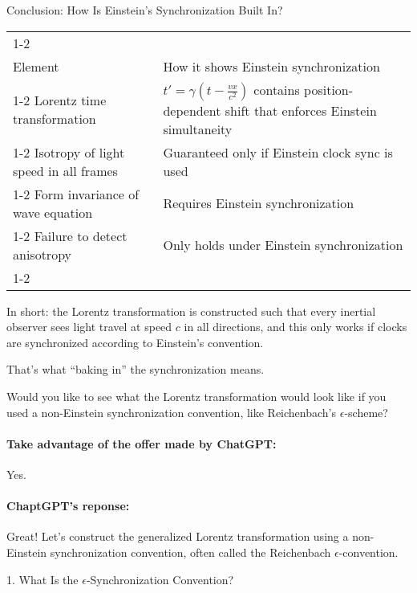 \documentclass[a4paper]{article}
\theoremstyle{plain}
\theoremstyle{definition}
\begin{document}
Conclusion: How Is Einstein's Synchronization Built In?

\begin{tabularx}{1.0\textwidth}{|p{3.4cm}|p{10cm}|}
\cline{1-2} \\
Element & How it shows Einstein synchronization
\\ \cline{1-2}
Lorentz time transformation & $t' = \gamma(t - \frac{vx}{c^2})$ contains position-dependent shift that enforces Einstein simultaneity
\\ \cline{1-2}
Isotropy of light speed in all frames & Guaranteed only if Einstein clock sync is used
\\ \cline{1-2}
Form invariance of wave equation & Requires Einstein synchronization
\\ \cline{1-2}
Failure to detect anisotropy & Only holds under Einstein synchronization
\\ \cline{1-2}
\end{tabularx}

In short: the Lorentz transformation is constructed such that every
inertial observer sees light travel at speed $c$ in all directions,
and this only works if clocks are synchronized according to Einstein's
convention.

That's what ``baking in'' the synchronization means.

Would you like to see what the Lorentz transformation would look like
if you used a non-Einstein synchronization convention, like
Reichenbach's $\epsilon$-scheme?

\paragraph{Take advantage of the offer made by ChatGPT:}

Yes.

\paragraph{ChaptGPT's reponse:}

Great!  Let's construct the generalized Lorentz transformation using a
non-Einstein synchronization convention, often called the Reichenbach
$\epsilon$-convention.

1. What Is the $\epsilon$-Synchronization Convention?
\end{document}
